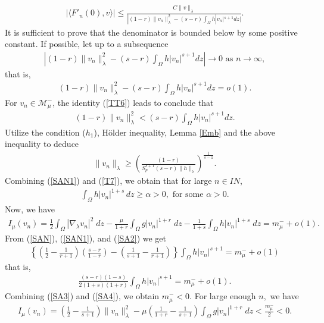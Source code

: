 \documentclass[12pt, notitlepage]{article}
\def\N{{I\!\!N}}
\begin{document}
{\begin{align}
    |\langle F'_n(0),v\rangle|\leq \frac{C\|v\|_\lambda}{|(1-r)\|v_n\|_\lambda^2-(s-r)\int_\Omega h|v_n|^{s+1} dz|}.
\end{align}
It is sufficient to prove that the denominator is bounded below by some positive constant. If possible, let up to a subsequence
\begin{align}
    \left |(1-r)\|v_n\|_\lambda^2-(s-r)\int_\Omega h|v_n|^{s+1} dz\right |\to 0 \text{ as } n\to \infty,
\end{align}
that is,
\begin{align}\label{SAN1}
    (1-r)\|v_n\|_\lambda^2-(s-r)\int_\Omega h|v_n|^{s+1} dz=o(1).
\end{align}
For $v_n\in\mathscr{M}^-_\mu$, the identity (\ref{TT6}) leads to conclude that
\begin{align*}
  (1-r)\|v_n\|_\lambda^2<(s-r)\int_\Omega h|v_n|^{s+1} dz.  
\end{align*}
Utilize the condition ($h_1$), H\"{o}lder inequality, Lemma \ref{Emb} and the above inequality to deduce
\begin{align}\label{T7}
    \|v_n\|_\lambda\geq \left (\frac{(1-r)}{S_p^{s+1}(s-r)\|h\|_b}\right )^\frac{1}{s-1}.
\end{align}
Combining (\ref{SAN1}) and (\ref{T7}), we obtain that for large $n\in\N$,
\begin{align}\label{SA3}
    \int_\Omega h|v_n|^{1+s}\, dz\geq \alpha>0, \text{ for some }\alpha>0.
\end{align}
Now, we have
\begin{align}\label{SA2}
I_\mu(v_n)=\frac{1}{2}\int_\Omega |\nabla_\lambda v_n|^2\;dz-\frac{\mu}{1+r}\int_\Omega g|v_n|^{1+r}\;dz-\frac{1}{1+s}\int_\Omega h|v_n|^{1+s}\; dz=m^-_\mu+o(1).    
\end{align}
From (\ref{SAN}), (\ref{SAN1}), and (\ref{SA2}) we get
\begin{align}
  \left \{  \left (\frac{1}{2}-\frac{1}{r+1}\right )\left (\frac{s-r}{1-r}\right )-\left( \frac{1}{s+1}-\frac{1}{r+1}\right )\right \}\int_\Omega h|v_n|^{s+1}=m^-_\mu+o(1)
\end{align}
that is,
\begin{align}\label{SA4}
    \frac{(s-r)(1-s)}{2(1+s)(1+r)}\int_\Omega h|v_n|^{s+1}=m^-_\mu+o(1).
\end{align}
 Combining (\ref{SA3}) and (\ref{SA4}), we obtain $m^-_\mu<0$. For large enough $n,$ we have 
 \begin{align}
     I_\mu(v_n)=\left (\frac{1}{2}-\frac{1}{s+1}\right )\|v_n\|_\lambda^2-\mu\left (\frac{1}{1+r}-\frac{1}{s+1}\right)\int_\Omega g|v_n|^{1+r}\;dz<\frac{m_\mu^-}{2}<0.

\end{align}}
\end{document}
